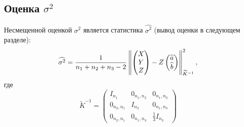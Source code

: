 \subsection*{Оценка $\sigma^2$}

Несмещенной оценкой $\sigma^2$ является статистика $\widehat{\sigma^2}$ (вывод оценки в следующем разделе):
\begin{equation}
    \widehat{\sigma^2}
    =
    \frac{1}{n_1 + n_2 + n_3 - 2}
    \left \| {
        \begin{pmatrix}
            X \\
            Y \\
            Z
        \end{pmatrix}
        - Z
        \begin{pmatrix}
            \widehat{a} \\
            \widehat{b}
        \end{pmatrix}
    } \right \|_{\widetilde{K}^{-1}}^2 ,
\end{equation}
где
\begin{equation}
    \widetilde{K}^{-1}
    =
    \begin{pmatrix}
        I_{n_1}     & 0_{n_1,n_2}  & 0_{n_1, n_3}        \\
        0_{n_2,n_1} & I_{n_2}      & 0_{n_1, n_3}        \\
        0_{n_2,n_1} & 0_{n_1, n_3} & \frac{1}{3} I_{n_3}
    \end{pmatrix}
\end{equation}

